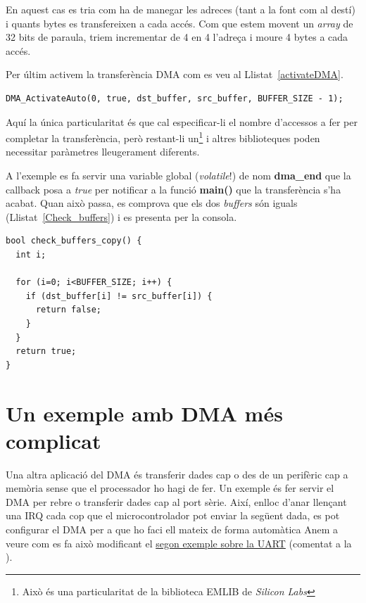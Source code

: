 En aquest cas es tria com ha de manegar les adreces (tant a la font com al destí) i quants bytes es transfereixen a cada accés. Com que estem movent un {\em array} de 32 bits de paraula, triem incrementar de 4 en 4 l'adreça i moure 4 bytes a cada accés.

Per últim activem la transferència \gls{DMA} com es veu al Llistat~\ref{activateDMA}.
\begin{lstlisting}[style=customc, caption={Activació de la transferència DMA}, label=activateDMA]
DMA_ActivateAuto(0, true, dst_buffer, src_buffer, BUFFER_SIZE - 1);
\end{lstlisting}

Aquí la única particularitat és que cal especificar-li el nombre d'accessos a fer per completar la transferència, però restant-li un\footnote{Això és una particularitat de la biblioteca EMLIB de {\em Silicon Labs}} i altres biblioteques poden necessitar paràmetres lleugerament diferents.

A l'exemple es fa servir una variable global ({\em volatile}!) de nom {\bf dma\_end} que la \gls{callback} posa a {\em true} per notificar a la funció {\bf main()} que la transferència s'ha acabat. Quan això passa, es comprova que els dos {\em buffers} són iguals (Llistat~\ref{Check_buffers}) i es presenta per la consola.

\begin{lstlisting}[style=customc, caption={Comparació dels dos buffers de l'exemple DMA}, label=Check_buffers]
bool check_buffers_copy() {
  int i;

  for (i=0; i<BUFFER_SIZE; i++) {
    if (dst_buffer[i] != src_buffer[i]) {
      return false;
    }
  }
  return true;
}
\end{lstlisting}


\section{Un exemple amb DMA més complicat}
\label{sec:DMA_example_2}

Una altra aplicació del \gls{DMA} és transferir dades cap o des de un perifèric cap a memòria sense que el processador ho hagi de fer. Un exemple és fer servir el DMA per rebre o transferir dades cap al port sèrie. Així, enlloc d'anar llençant una \gls{IRQ} cada cop que el microcontrolador pot enviar la següent dada, es pot configurar el DMA per a que ho faci ell mateix de forma automàtica Anem a veure com es fa això modificant el \href{https://sistemesencastats.wordpress.com/2018/03/08/serie-i-usb-cp2102/}{segon exemple sobre la UART} (comentat a la ).


